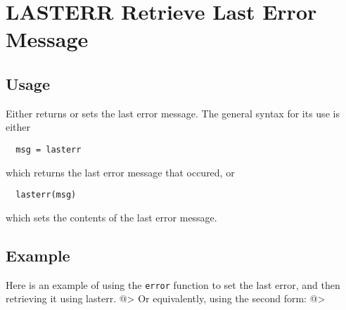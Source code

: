 \section{LASTERR Retrieve Last Error Message}

\subsection{Usage}

Either returns or sets the last error message.  The
general syntax for its use is either
\begin{verbatim}
  msg = lasterr
\end{verbatim}
which returns the last error message that occured, or
\begin{verbatim}
  lasterr(msg)
\end{verbatim}
which sets the contents of the last error message.
\subsection{Example}

Here is an example of using the \verb|error| function to
set the last error, and then retrieving it using
lasterr.
@>
Or equivalently, using the second form:
@>
